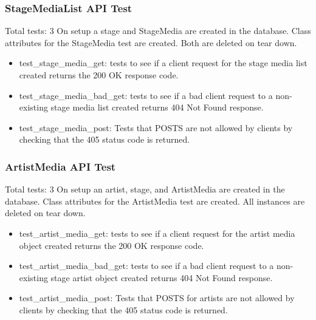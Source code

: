 \documentclass[12pt,english]{scrartcl}
\begin{document}
\subsubsection{StageMediaList API Test}
Total tests: 3
On setup a stage and StageMedia are created in the database. Class attributes for the StageMedia test are created.
Both are deleted on tear down.
\begin{itemize}
\item test\_stage\_media\_get: tests to see if a client request for the stage media list created returns the 200 OK response code.

\item test\_stage\_media\_bad\_get: tests to see if a bad client request to a non-existing stage media list created returns
                                     404 Not Found response.
\item test\_stage\_media\_post: Tests that POSTS are not allowed by clients by checking that the 405 status code is returned.
\end{itemize}


\subsubsection{ArtistMedia API Test} 
Total tests: 3
On setup an artist, stage, and ArtistMedia are created in the database. Class attributes for the ArtistMedia test are created.
All instances are deleted on tear down.
\begin{itemize}
 \item test\_artist\_media\_get: tests to see if a client request for the artist media object created returns the 200 OK response code.
 
 \item test\_artist\_media\_bad\_get: tests to see if a bad client request to a non-existing stage artist object created returns 
                                     404 Not Found response.
 
 \item test\_artist\_media\_post: Tests that POSTS for artists are not allowed by clients by checking that the 405 status code is returned.
\end{itemize}
\end{document}
